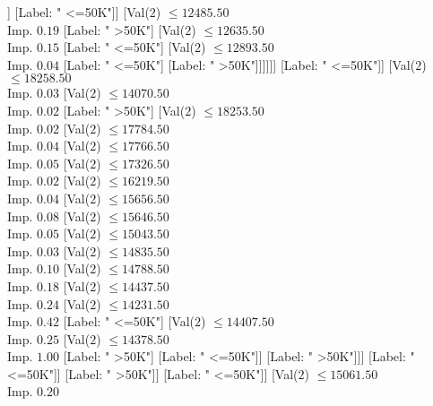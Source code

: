 \documentclass[margin=10pt]{standalone}
\begin{document}
\begin{forest}
																	[Label: " <=50K"]
																	[Label: " >50K"]]
																[Label: " <=50K"]]
															[Val($2$) $ \leq 12485.50$ \\ Imp. $0.19$
																[Label: " >50K"]
																[Val($2$) $ \leq 12635.50$ \\ Imp. $0.15$
																	[Label: " <=50K"]
																	[Val($2$) $ \leq 12893.50$ \\ Imp. $0.04$
																		[Label: " <=50K"]
																		[Label: " >50K"]]]]]]
													[Label: " <=50K"]]
												[Val($2$) $ \leq 18258.50$ \\ Imp. $0.03$
													[Val($2$) $ \leq 14070.50$ \\ Imp. $0.02$
														[Label: " >50K"]
														[Val($2$) $ \leq 18253.50$ \\ Imp. $0.02$
															[Val($2$) $ \leq 17784.50$ \\ Imp. $0.04$
																[Val($2$) $ \leq 17766.50$ \\ Imp. $0.05$
																	[Val($2$) $ \leq 17326.50$ \\ Imp. $0.02$
																		[Val($2$) $ \leq 16219.50$ \\ Imp. $0.04$
																			[Val($2$) $ \leq 15656.50$ \\ Imp. $0.08$
																				[Val($2$) $ \leq 15646.50$ \\ Imp. $0.05$
																					[Val($2$) $ \leq 15043.50$ \\ Imp. $0.03$
																						[Val($2$) $ \leq 14835.50$ \\ Imp. $0.10$
																							[Val($2$) $ \leq 14788.50$ \\ Imp. $0.18$
																								[Val($2$) $ \leq 14437.50$ \\ Imp. $0.24$
																									[Val($2$) $ \leq 14231.50$ \\ Imp. $0.42$
																										[Label: " <=50K"]
																										[Val($2$) $ \leq 14407.50$ \\ Imp. $0.25$
																											[Val($2$) $ \leq 14378.50$ \\ Imp. $1.00$
																												[Label: " >50K"]
																												[Label: " <=50K"]]
																											[Label: " >50K"]]]
																									[Label: " <=50K"]]
																								[Label: " >50K"]]
																							[Label: " <=50K"]]
																						[Val($2$) $ \leq 15061.50$ \\ Imp. $0.20$

\end{forest}
\end{document}
